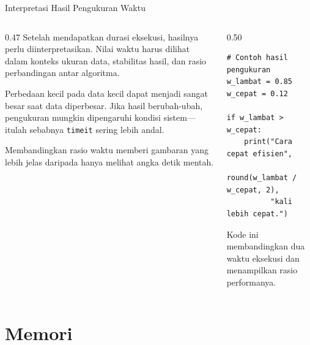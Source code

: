 \documentclass[aspectratio=169, table]{beamer}
\begin{document}
\begin{frame}[fragile]{Interpretasi Hasil Pengukuran Waktu}
\vspace{10pt}

\begin{columns}[T]

\begin{column}{0.47\linewidth}
\small
Setelah mendapatkan durasi eksekusi, hasilnya perlu diinterpretasikan.
Nilai waktu harus dilihat dalam konteks ukuran data, stabilitas hasil,
dan rasio perbandingan antar algoritma.  

Perbedaan kecil pada data kecil dapat menjadi sangat besar saat data diperbesar.
Jika hasil berubah-ubah, pengukuran mungkin dipengaruhi kondisi sistem—%
itulah sebabnya \texttt{timeit} sering lebih andal.

Membandingkan rasio waktu memberi gambaran yang lebih jelas daripada hanya
melihat angka detik mentah.
\end{column}

\begin{column}{0.50\linewidth}

\begin{lstlisting}[style=PythonStyle, basicstyle=\ttfamily\scriptsize]
# Contoh hasil pengukuran
w_lambat = 0.85
w_cepat = 0.12

if w_lambat > w_cepat:
    print("Cara cepat efisien",
          round(w_lambat / w_cepat, 2),
          "kali lebih cepat.")
\end{lstlisting}

Kode ini membandingkan dua waktu eksekusi
dan menampilkan rasio performanya.
\end{column}

\end{columns}
\end{frame}

\section{Memori}
\end{document}
